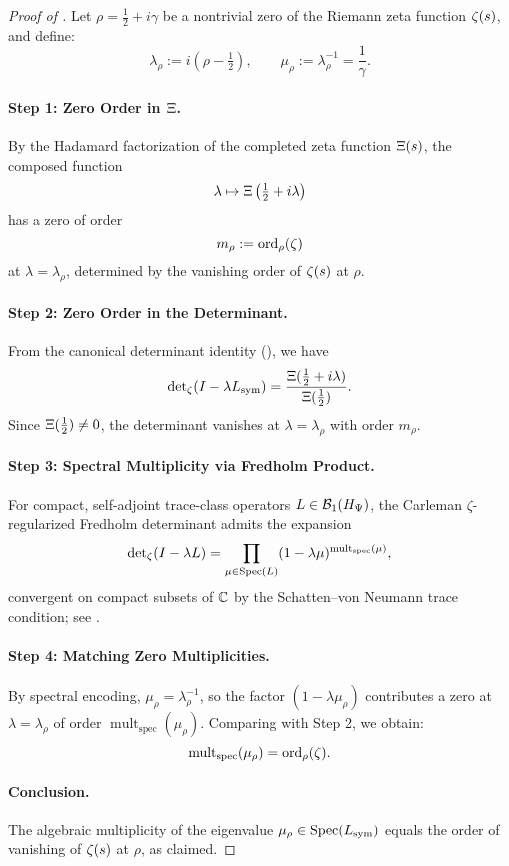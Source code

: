 \begin{proof}[Proof of ]
Let \( \rho = \tfrac{1}{2} + i\gamma \) be a nontrivial zero of the Riemann zeta function \( \zeta(s) \), and define:
\[
\lambda_\rho := i(\rho - \tfrac{1}{2}), \qquad \mu_\rho := \lambda_\rho^{-1} = \frac{1}{\gamma}.
\]

\paragraph{Step 1: Zero Order in \(\Xi\).}
By the Hadamard factorization of the completed zeta function \( \Xi(s) \), the composed function
\[
\lambda \mapsto \Xi\left( \tfrac{1}{2} + i\lambda \right)
\]
has a zero of order
\[
m_\rho := \operatorname{ord}_\rho(\zeta)
\]
at \( \lambda = \lambda_\rho \), determined by the vanishing order of \( \zeta(s) \) at \( \rho \).

\paragraph{Step 2: Zero Order in the Determinant.}
From the canonical determinant identity (), we have
\[
\det\nolimits_\zeta(I - \lambda L_{\mathrm{sym}}) = \frac{\Xi(\tfrac{1}{2} + i\lambda)}{\Xi(\tfrac{1}{2})}.
\]
Since \( \Xi(\tfrac{1}{2}) \neq 0 \), the determinant vanishes at \( \lambda = \lambda_\rho \) with order \( m_\rho \).

\paragraph{Step 3: Spectral Multiplicity via Fredholm Product.}
For compact, self-adjoint trace-class operators \( L \in \mathcal{B}_1(H_{\Psi}) \), the Carleman \(\zeta\)-regularized Fredholm determinant admits the expansion
\[
\det\nolimits_\zeta(I - \lambda L) = \prod_{\mu \in \operatorname{Spec}(L)} (1 - \lambda \mu)^{\operatorname{mult}_{\mathrm{spec}}(\mu)},
\]
convergent on compact subsets of \( \mathbb{C} \) by the Schatten–von Neumann trace condition; see \cite[Thm.~4.2]{Simon2005TraceIdeals}.

\paragraph{Step 4: Matching Zero Multiplicities.}
By spectral encoding, \( \mu_\rho = \lambda_\rho^{-1} \), so the factor \( (1 - \lambda \mu_\rho) \) contributes a zero at \( \lambda = \lambda_\rho \) of order \( \operatorname{mult}_{\mathrm{spec}}(\mu_\rho) \). Comparing with Step 2, we obtain:
\[
\operatorname{mult}_{\mathrm{spec}}(\mu_\rho) = \operatorname{ord}_\rho(\zeta).
\]

\paragraph{Conclusion.}
The algebraic multiplicity of the eigenvalue \( \mu_\rho \in \operatorname{Spec}(L_{\mathrm{sym}}) \) equals the order of vanishing of \( \zeta(s) \) at \( \rho \), as claimed.
\end{proof}
